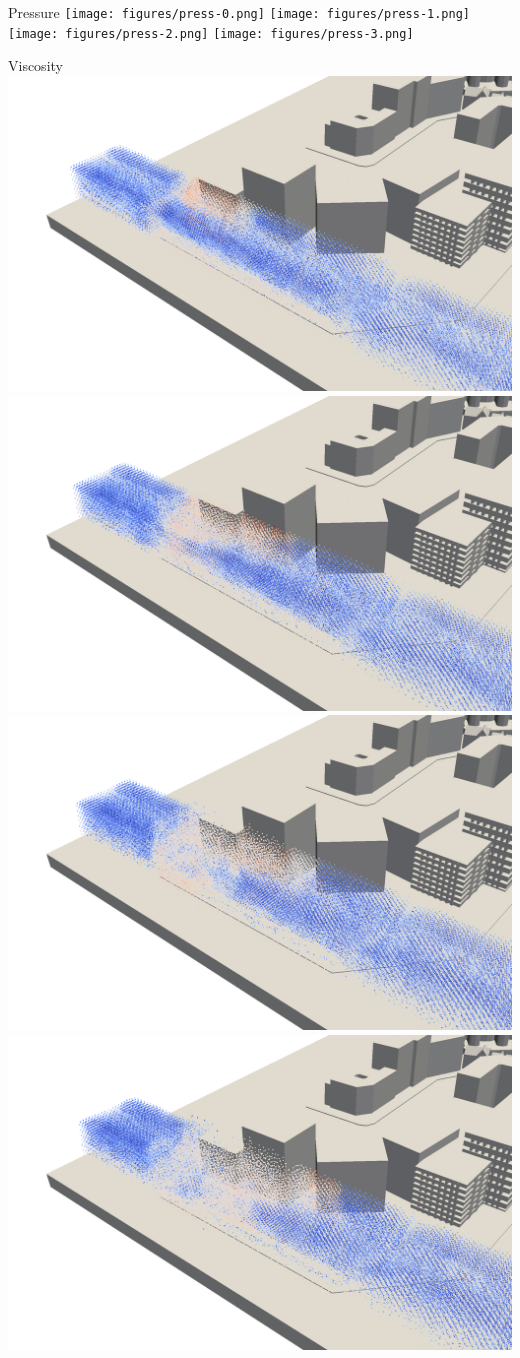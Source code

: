 \documentclass[8pt,sans,mathserif,aspectratio=43]{beamer}
\begin{document}

\begin{frame}{Pressure}
  \texttt{[image: figures/press-0.png]}
  \texttt{[image: figures/press-1.png]}\\
  \texttt{[image: figures/press-2.png]}
  \texttt{[image: figures/press-3.png]}
\end{frame}


\begin{frame}{Viscosity}
  \includegraphics[width=.5\textwidth]{figures/visc-0.png}
  \includegraphics[width=.5\textwidth]{figures/visc-1.png}\\
  \includegraphics[width=.5\textwidth]{figures/visc-2.png}
  \includegraphics[width=.5\textwidth]{figures/visc-3.png}
\end{frame}
\end{document}
